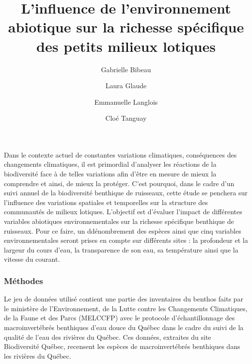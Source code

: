 \documentclass[9pt,twocolumn,twoside,]{pnas-new}
\title{L'influence de l'environnement abiotique sur la richesse
spécifique des petits milieux lotiques}
\author[a,1]{Gabrielle Bibeau}
\author[a]{Laura Glaude}
\author[a]{Emmanuelle Langlois}
\author[a]{Cloé Tanguay}
\affil[a]{Université de Sherbrooke, Département de Biologie, 2500
Boulevard de l'Université, Sherbrooke, Québec, Canada}
\begin{document}
\verticaladjustment{-2pt}



\maketitle
\thispagestyle{firststyle}



Dans le contexte actuel de constantes variations climatiques,
conséquences des changements climatiques, il est primordial d'analyser
les réactions de la biodiversité face à de telles variations afin d'être
en mesure de mieux la comprendre et ainsi, de mieux la protéger. C'est
pourquoi, dans le cadre d'un suivi annuel de la biodiversité benthique
de ruisseaux, cette étude se penchera sur l'influence des variations
spatiales et temporelles sur la structure des communautés de milieux
lotiques. L'objectif est d'évaluer l'impact de différentes variables
abiotiques environnementales sur la richesse spécifique benthique de
ruisseaux. Pour ce faire, un ddénombrement des espèces ainsi que cinq
variables environnementales seront prises en compte sur différents sites
: la profondeur et la largeur du cours d'eau, la transparence de son
eau, sa température ainsi que la vitesse du courant.

\hypertarget{muxe9thodes}{%
\subsubsection*{Méthodes}\label{muxe9thodes}}

Le jeu de données utilisé contient une partie des inventaires du benthos
faits par le ministère de l'Environnement, de la Lutte contre les
Changements Climatiques, de la Faune et des Parcs (MELCCFP) avec le
protocole d'échantillonnage des macroinvertébrés benthiques d'eau douce
du Québec dans le cadre du suivi de la qualité de l'eau des rivières du
Québec. Ces données, extraites du site Biodiversité Québec, recensent
les espèces de macroinvertébrés benthiques dans les rivières du Québec.
\end{document}
